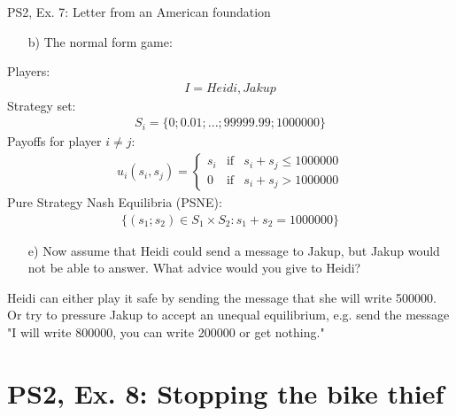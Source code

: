 \begin{frame}{PS2, Ex. 7: Letter from an American foundation}
  \begin{multicols}{2}
    \begin{itemize}
      \item[b)] The normal form game:
    \end{itemize}
    Players: \begin{align*}I={Heidi,Jakup}\end{align*}
    Strategy set: \begin{align*}
      S_i = \{0; 0.01; ... ; 99999.99; 1000000\}\end{align*}
    Payoffs for player $i\neq j$: \begin{align*}
      u_i(s_i,s_j)=
      \left\{ \begin{array}{ccl}
      s_i & \mbox{if} & s_i+s_j \leq 1000000 \\
      0   & \mbox{if} & s_i+s_j > 1000000
      \end{array}\right. \end{align*}
    Pure Strategy Nash Equilibria (PSNE): \begin{align*} \{(s_1; s_2)\in S_1\times S_2 : s_1 + s_2 = 1000000\} \end{align*}
  \vfill\null \columnbreak
    \begin{itemize}
      \item[e)] Now assume that Heidi could send a message to Jakup, but Jakup would not be able to answer. What advice would you give to Heidi?
    \end{itemize}
    Heidi can either play it safe by sending the message that she will write 500000.\\\medskip
    Or try to pressure Jakup to accept an unequal equilibrium, e.g. send the message "I will write 800000, you can write 200000 or get nothing."
  \vfill\null
  \end{multicols}
\end{frame}


\section{PS2, Ex. 8: Stopping the bike thief}


